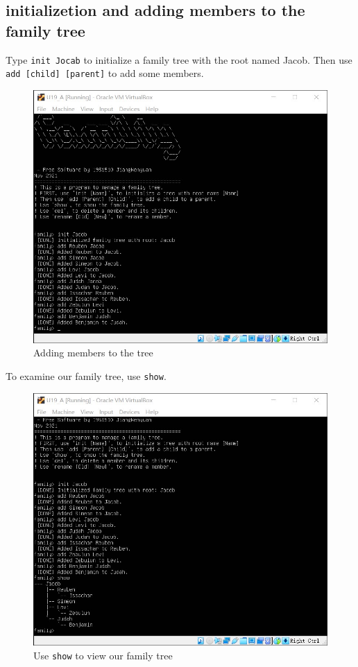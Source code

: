 \documentclass[cn,black,12pt,normal]{elegantnote}
\begin{document}
\subsection{initializetion and adding members to the family tree}

Type \lstinline{init Jocab} to initialize a family tree with the root named Jacob. Then use \lstinline{add [child] [parent]} to add some members.

\begin{figure}[H]
    \centering
    \includegraphics[width=0.7\linewidth]{image/f02.jpg}
    \caption{Adding members to the tree}
\end{figure}

To examine our family tree, use \lstinline{show}.

\begin{figure}[H]
    \centering
    \includegraphics[width=0.7\linewidth]{image/f03.jpg}
    \caption{Use \lstinline{show} to view our family tree}
\end{figure}
\end{document}
